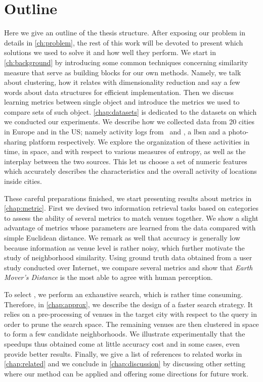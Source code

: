 \section{Outline}
\label{sec:overview}

Here we give an outline of the thesis structure.  After exposing our problem in
details in \autoref{ch:problem}, the rest of this work will be devoted to
present which solutions we used to solve it and how well they perform. We start in
\autoref{ch:background} by introducing some common techniques concerning
similarity measure that serve as building blocks for our own methods.  Namely,
we talk about clustering, how it relates with dimensionality reduction and say
a few words about data structures for efficient implementation. Then we discuss
learning metrics between single object and introduce the metrics we used to
compare sets of such object. \autoref{chap:datasets} is dedicated to the
datasets on which we conducted our experiments. We describe how we collected
data from 20 cities in Europe and in the US; namely activity logs from \fs\ and
\flickr, a \gls{lbsn} and a photo-sharing platform respectively. We explore the
organization of these activities in time, in space, and with respect to various measures of
entropy, as well as the interplay between the two sources. This let us
choose a set of numeric features which accurately describes the characteristics
and the overall activity of locations inside cities.

These careful preparations finished, we start presenting results about
metrics in \autoref{chap:metric}. First we devised two information retrieval
tasks based on \fs{} categories to assess the ability of several metrics to match
venues together. We show a slight advantage of metrics whose parameters
are learned from the data compared with simple Euclidean distance. We remark
as well that accuracy is generally low because information as venue level is
rather noisy, which further motivate the study of neighborhood similarity.
Using ground truth data obtained from a user study conducted over Internet, we
compare several metrics and show that \emph{Earth Mover's Distance} is the
most able to agree with human perception.

To select \emd{}, we perform an exhaustive search, which is rather time
consuming. Therefore, in \autoref{chap:approx}, we describe the design of a
faster search strategy. It relies on a pre-processing of venues in the target
city with respect to the query in order to prune the search space. The
remaining venues are then clustered in space to form a few candidate
neighborhoods. We illustrate experimentally that the speedups thus obtained
come at little accuracy cost and in some cases, even provide better results.
Finally, we give a list of references to related works in
\autoref{chap:related} and we conclude in \autoref{chap:discussion} by
discussing other setting where our method can be applied and offering some
directions for future work.


